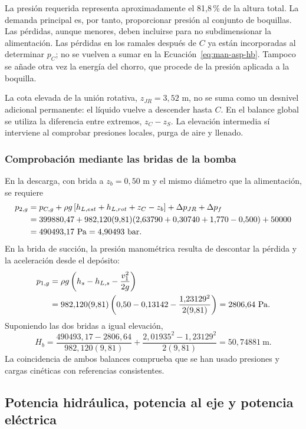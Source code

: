 La presión requerida representa aproximadamente el 81,8\,\% de la
altura total. La demanda principal es, por tanto, proporcionar presión
al conjunto de boquillas. Las pérdidas, aunque menores, deben incluirse
para no subdimensionar la alimentación.
Las pérdidas en los ramales después de $C$ ya están incorporadas al
determinar $p_C$; no se vuelven a sumar en la
Ecuación~\eqref{eq:man-asp-hb}. Tampoco se añade otra vez la energía del
chorro, que procede de la presión aplicada a la boquilla.

La cota elevada de la unión rotativa, $z_{JR}=3{,}52$ m, no se suma como
un desnivel adicional permanente: el líquido vuelve a descender hasta
$C$. En el balance global se utiliza la diferencia entre extremos,
$z_C-z_S$. La elevación intermedia sí interviene al comprobar presiones
locales, purga de aire y llenado.

\subsubsection{Comprobación mediante las bridas de la bomba}
En la descarga, con brida a $z_b=0{,}50$ m y el mismo diámetro que la
alimentación, se requiere
\begin{align}
 p_{2,g}&=p_{C,g}+\rho g\left[h_{L,est}+h_{L,rot}+z_C-z_b\right]
 +\Delta p_{JR}+\Delta p_f\notag\\
 &=399880{,}47+982{,}120(9{,}81)
 (2{,}63790+0{,}30740+1{,}770-0{,}500)+50000\notag\\
 &=490493{,}17\ \mathrm{Pa}=4{,}90493\ \mathrm{bar}.
 \label{eq:man-asp-p2}
\end{align}
En la brida de succión, la presión manométrica resulta de descontar la
pérdida y la aceleración desde el depósito:
\begin{align}
 p_{1,g}&=\rho g\left(h_s-h_{L,s}-\frac{v_1^2}{2g}\right)\notag\\
 &=982{,}120(9{,}81)
 \left(0{,}50-0{,}13142-\frac{1{,}23129^2}{2(9{,}81)}\right)
 =2806{,}64\ \mathrm{Pa}.
\end{align}
Suponiendo las dos bridas a igual elevación,
\begin{equation}
 H_b=\frac{490493{,}17-2806{,}64}{982{,}120(9{,}81)}
 +\frac{2{,}01935^2-1{,}23129^2}{2(9{,}81)}
 =50{,}74881\ \mathrm{m}.
\end{equation}
La coincidencia de ambos balances comprueba que se han usado presiones
y cargas cinéticas con referencias consistentes.

\subsection{Potencia hidráulica, potencia al eje y potencia eléctrica}
\label{sec:man-asp-potencia}


